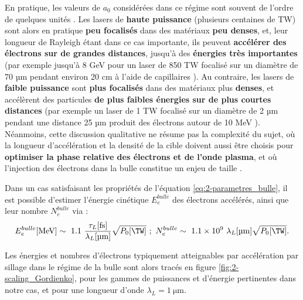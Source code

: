 \begin{refsection}
En pratique, les valeurs de $a_0$ considérées dans ce régime sont souvent de l'ordre de quelques unités \parencite{esarey_2009, faure_2019}. Les lasers de \textbf{haute puissance} (plusieurs centaines de TW) sont alors en pratique \textbf{peu focalisés} dans des matériaux \textbf{peu denses}, et, leur longueur de Rayleigh étant dans ce cas importante, ils peuvent \textbf{accélérer des électrons sur de grandes distances}, jusqu'à des \textbf{énergies très importantes} (par exemple jusqu'à 8 GeV pour un laser de 850 TW focalisé sur un diamètre de 70 µm pendant environ 20 cm à l'aide de capillaires \parencite{gonsalves_2019}). Au contraire, les lasers de \textbf{faible puissance} sont \textbf{plus focalisés} dans des matériaux plus \textbf{denses}, et accélèrent des particules \textbf{de plus faibles énergies sur de plus courtes distances} (par exemple un laser de 1 TW focalisé sur un diamètre de 2 µm pendant une distance 25 µm produit des électrons autour de 10 MeV \parencite{faure_2019}). Néanmoins, cette discussion qualitative ne résume pas la complexité du sujet, où la longueur d'accélération et la densité de la cible doivent aussi être choisis pour \textbf{optimiser la phase relative des électrons et de l'onde plasma}, et où l'injection des électrons dans la bulle constitue un enjeu de taille \parencite{esarey_2009}. 

Dans un cas satisfaisant les propriétés de l'équation \ref{eq:2-parametres_bulle}, il est possible d'estimer l'énergie cinétique $E_e^{bulle}$ des électrons accélérés, ainsi que leur nombre $N_e^{bulle}$ via \parencite{gordienko_2005} :
\begin{equation}
    E_e^{bulle} \si{[\MeV]}\sim ~ 1.1 ~ \dfrac{\tau_L \si{[\fs]}}{\lambda_L\si{[\um]}} \sqrt{P_0\si{[\TW]}} ~ ; ~ N_e^{bulle} \sim ~ 1.1 \times 10^9 ~ \lambda_L\si{[\um]} \sqrt{P_0\si{[\TW]}}\rm .
    \label{eq:2-scaling_Gordienko}
\end{equation}

Les énergies et nombres d'électrons typiquement atteignables par accélération par sillage dans le régime de la bulle sont alors tracés en figure \ref{fig:2-scaling_Gordienko}, pour les gammes de puissances et d'énergie pertinentes dans notre cas, et pour une longueur d'onde $\lambda_L=1 ~ \si{\um}$.


\end{refsection}
